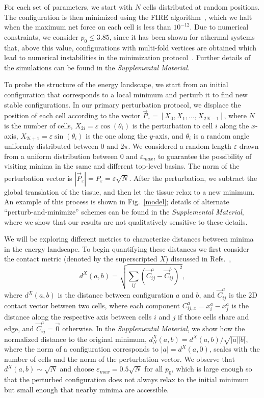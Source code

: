 \documentclass[reprint,amsmath,amssymb,aps]{revtex4-2}
\begin{document}
For each set of parameters, we start with $N$ cells distributed at random positions. The configuration is then minimized using the FIRE algorithm~\cite{Bitzek2006}, which we halt when the maximum net force on each cell is less than $10^{-12}$. Due to numerical constraints, we consider $p_0\leqslant3.85$, since it has been shown for athermal systems that, above this value, configurations with multi-fold vertices are obtained which lead to numerical instabilities in the minimization protocol~\cite{Sussman2018}. Further details of the simulations can be found in the \textit{Supplemental Material}.


To probe the structure of the energy landscape, we start from an initial configuration that corresponds to a local minimum and perturb it to find new stable configurations. In our primary perturbation protocol, we displace the position of each cell according to the vector $\overrightarrow{P}_{\varepsilon}=[X_0, X_1,\ldots, X_{2N-1}]$, where $N$ is the number of cells, $X_{2i}=\varepsilon\cos(\theta_i)$ is the perturbation to cell $i$ along the $x$-axis, $X_{2i+1}=\varepsilon\sin(\theta_i)$ is the one along the $y$-axis, and $\theta_i$ is a random angle uniformly distributed between $0$ and $2\pi$. We considered a random length $\varepsilon$ drawn from a uniform distribution between $0$ and $\varepsilon_{max}$, to guarantee the possibility of visiting minima in the same and different top-level basins. The norm of the perturbation vector is $|\overrightarrow{P}_{\varepsilon}|=P_{\varepsilon}=\varepsilon\sqrt{N}$. After the perturbation, we subtract the global translation of the tissue, and then let the tissue relax to a new minimum. An example of this process is shown in Fig.~\ref{model}; details of alternate ``perturb-and-minimize'' schemes can be found in the \textit{Supplemental Material}, where we show that our results are not qualitatively sensitive to these details.


We will be exploring different metrics to characterize distances between minima in the energy landscape. To begin quantifying these distances we first consider the contact metric (denoted by the superscripted $X$) discussed in Refs.~\cite{Dennis2020, Liao2019, Artiaco2020},
\begin{equation}\label{metric}
	d^X(a,b)=\sqrt{\sum_{ij}(\vec{C}^{a}_{ij}-\vec{C}^{b}_{ij})^2},
\end{equation}
where $d^X(a,b)$ is the distance between configuration $a$ and $b$, and $\vec{C}^{a}_{ij}$ is the 2D contact vector between two cells, where each component $C^{a}_{ij,x}=x_i^a-x_j^a$ is the distance along the respective axis between cells $i$ and $j$ if those cells share and edge, and $\vec{C}^{a}_{ij}=\vec{0}$ otherwise. In the \textit{Supplemental Material}, we show how the normalized distance to the original minimum, $d^X_N(a,b)=d^X(a,b)/\sqrt{|a| |b|}$, where the norm of a configuration corresponds to $|a|=d^X(a,0)$, scales with the number of cells and the norm of the perturbation vector. We observe that $d^X(a,b)\sim\sqrt{N}$ and choose $\varepsilon_{max}=0.5\sqrt{N}$ for all $p_{0}$, which is large enough so that the perturbed configuration does not always relax to the initial minimum but small enough that nearby minima are accessible.
\end{document}
